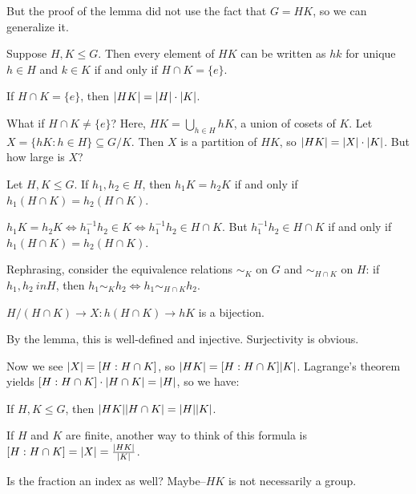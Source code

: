\documentclass[12pt,letterpaper]{report}
\begin{document}
But the proof of the lemma did not use the fact that $G = HK$, so we can generalize it.

\begin{lem}{}{}
  Suppose $H, K \leq G$.
  Then every element of $HK$ can be written as $hk$ for unique $h \in H$ and $k \in K$ if and only
  if $H \cap K = \{e\}$.
\end{lem}

If $H \cap K = \{e\}$, then $\lvert HK\rvert = \lvert H\rvert \cdot \lvert K\rvert$.

What if $H \cap K \neq \{e\}$?
Here, $HK = \bigcup_{h \in H} hK$, a union of cosets of $K$.
Let $X = \{hK : h \in H\} \subseteq G/K$.
Then $X$ is a partition of $HK$, so $\lvert HK\rvert = \lvert X\rvert \cdot \lvert K\rvert$.
But how large is $X$?

\begin{lem}{}{}
  Let $H, K \leq G$.
  If $h_1, h_2 \in H$, then $h_1K = h_2K$ if and only if $h_1(H \cap K) = h_2(H \cap K)$.
\end{lem}

\begin{thmproof}
  $h_1K = h_2K \iff h_1^{-1}h_2 \in K \iff h_1^{-1}h_2 \in H \cap K$.
  But $h_1^{-1}h_2 \in H \cap K$ if and only if $h_1(H \cap K) = h_2(H \cap K)$.
\end{thmproof}

Rephrasing, consider the equivalence relations $\sim_K$ on $G$ and $\sim_{H \cap K}$ on $H$:
if $h_1, h_2\ in H$, then $h_1 \sim_K h_2 \iff h_1 \sim_{H \cap K} h_2$.

\begin{cor}{}{}
  $H/(H \cap K) \to X \colon h(H \cap K) \to hK$ is a bijection.
\end{cor}

\begin{thmproof}
  By the lemma, this is well-defined and injective.
  Surjectivity is obvious.
\end{thmproof}

Now we see $\lvert X\rvert = [H : H \cap K]$, so $\lvert HK\rvert = [H : H \cap K] \lvert K\rvert$.
Lagrange's theorem yields $[H : H \cap K] \cdot \lvert H \cap K\rvert = \lvert H\rvert$, so we have:

\begin{prop}{}{}
  If $H, K \leq G$, then $\lvert HK\rvert\lvert H \cap K\rvert = \lvert H\rvert\lvert K\rvert$.
\end{prop}

If $H$ and $K$ are finite, another way to think of this formula is
$[H : H \cap K] = \lvert X\rvert = \frac{\lvert HK\rvert}{\lvert K\rvert}$.

Is the fraction an index as well?
Maybe--$HK$ is not necessarily a group.
\end{document}
